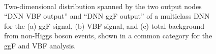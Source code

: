 \begin{figure}[ht]
    \centering
     \\
    \caption[Two-dimensional distribution spanned by two output nodes ``DNN VBF output'' and ``DNN ggF output'' of a multiclass DNN.]{Two-dimensional distribution spanned by the two output nodes ``DNN VBF output'' and ``DNN ggF output'' of a multiclass DNN for the (a) ggF signal, (b) VBF signal, and (c) total background from non-Higgs boson events, shown in a common \TwoJet category for the ggF \TwoJet and VBF analysis.}
    \label{app:fig:2d-discriminant}
\end{figure}

